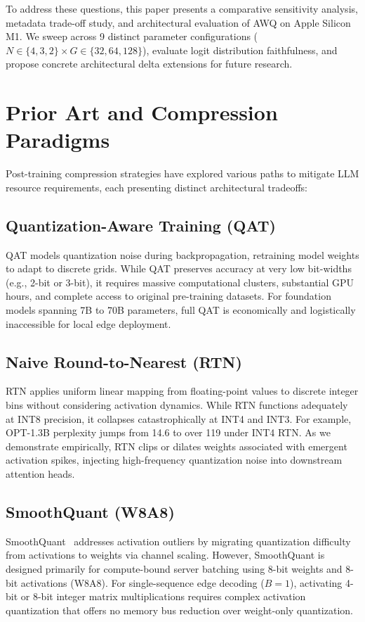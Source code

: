 \documentclass[conference]{IEEEtran}
\begin{document}
To address these questions, this paper presents a comparative sensitivity analysis, metadata trade-off study, and architectural evaluation of AWQ on Apple Silicon M1. We sweep across 9 distinct parameter configurations ($N \in \{4, 3, 2\} \times G \in \{32, 64, 128\}$), evaluate logit distribution faithfulness, and propose concrete architectural delta extensions for future research.

\section{Prior Art and Compression Paradigms}
Post-training compression strategies have explored various paths to mitigate LLM resource requirements, each presenting distinct architectural tradeoffs:

\subsection{Quantization-Aware Training (QAT)}
QAT models quantization noise during backpropagation, retraining model weights to adapt to discrete grids. While QAT preserves accuracy at very low bit-widths (e.g., 2-bit or 3-bit), it requires massive computational clusters, substantial GPU hours, and complete access to original pre-training datasets. For foundation models spanning 7B to 70B parameters, full QAT is economically and logistically inaccessible for local edge deployment.

\subsection{Naive Round-to-Nearest (RTN)}
RTN applies uniform linear mapping from floating-point values to discrete integer bins without considering activation dynamics. While RTN functions adequately at INT8 precision, it collapses catastrophically at INT4 and INT3. For example, OPT-1.3B perplexity jumps from 14.6 to over 119 under INT4 RTN. As we demonstrate empirically, RTN clips or dilates weights associated with emergent activation spikes, injecting high-frequency quantization noise into downstream attention heads.

\subsection{SmoothQuant (W8A8)}
SmoothQuant~\cite{xiao2023smoothquant} addresses activation outliers by migrating quantization difficulty from activations to weights via channel scaling. However, SmoothQuant is designed primarily for compute-bound server batching using 8-bit weights and 8-bit activations (W8A8). For single-sequence edge decoding ($B=1$), activating 4-bit or 8-bit integer matrix multiplications requires complex activation quantization that offers no memory bus reduction over weight-only quantization.
\end{document}
